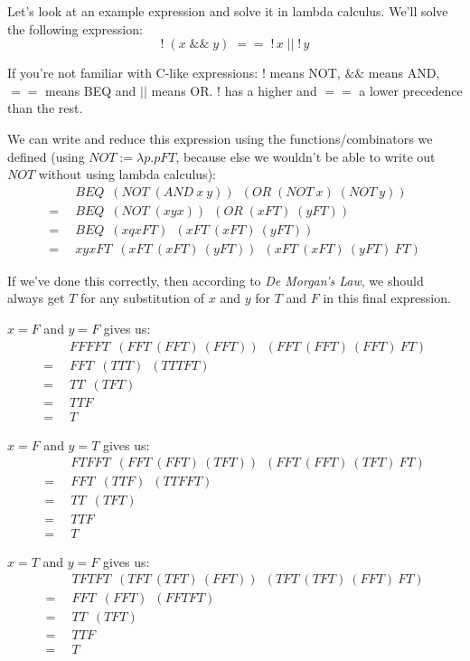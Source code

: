 \documentclass[11pt]{article}
\begin{document}
Let's look at an example expression and solve it in lambda calculus. We'll
solve the following expression:
\[!\;(x\;\&\&\;y)\;==\;!\,x\;||\;!\,y\]

If you're not familiar with C-like expressions: \(!\) means NOT, \(\&\&\) means
AND, \(==\) means BEQ and \(||\) means OR. \(!\) has a higher and \(==\) a
lower precedence than the rest.

We can write and reduce this expression using the functions/combinators we
defined (using \(NOT:=\lambda p.pFT\), because else we wouldn't be able to
write out \(NOT\) without using lambda calculus):
\begin{align*}
	&\enspace BEQ\enspace
		(NOT\;(AND\:x\:y))\enspace
		(OR\;(NOT\:x)\;(NOT\:y))\\
	=&\enspace BEQ\enspace
		(NOT\;(xyx))\enspace
		(OR\;(xFT)\;(yFT))\\
	=&\enspace BEQ\enspace
		(xqxFT)\enspace
		(xFT\:(xFT)\:(yFT))\\
	=&\enspace xyxFT\enspace
		(xFT\:(xFT)\:(yFT))\enspace
		(xFT\:(xFT)\:(yFT)\:FT)
\end{align*}


If we've done this correctly, then according to \emph{De Morgan's Law}, we
should always get \(T\) for any substitution of \(x\) and \(y\) for \(T\) and
\(F\) in this final expression.

\(x=F\) and \(y=F\) gives us:
\begin{align*}
	&\enspace FFFFT\enspace
		(FFT\:(FFT)\:(FFT))\enspace
		(FFT\:(FFT)\:(FFT)\:FT)\\
	=&\enspace FFT\enspace(TTT)\enspace(TTTFT)\\
	=&\enspace TT\enspace(TFT)\\
	=&\enspace TTF\\
	=&\enspace T
\end{align*}

\(x=F\) and \(y=T\) gives us:
\begin{align*}
	&\enspace FTFFT\enspace
		(FFT\:(FFT)\:(TFT))\enspace
		(FFT\:(FFT)\:(TFT)\:FT)\\
	=&\enspace FFT\enspace(TTF)\enspace(TTFFT)\\
	=&\enspace TT\enspace(TFT)\\
	=&\enspace TTF\\
	=&\enspace T
\end{align*}

\(x=T\) and \(y=F\) gives us:
\begin{align*}
	&\enspace TFTFT\enspace
		(TFT\:(TFT)\:(FFT))\enspace
		(TFT\:(TFT)\:(FFT)\:FT)\\
	=&\enspace FFT\enspace(FFT)\enspace(FFTFT)\\
	=&\enspace TT\enspace(TFT)\\
	=&\enspace TTF\\
	=&\enspace T\\
\end{align*}
\end{document}
